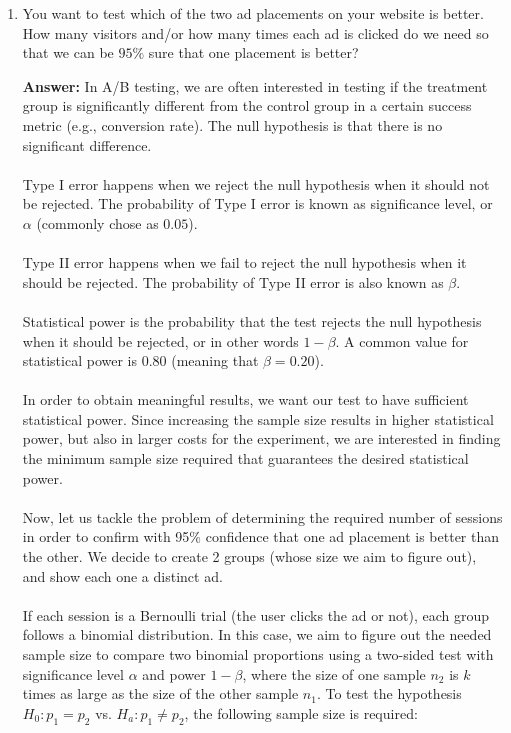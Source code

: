 \documentclass{article}
\newenvironment{QandA}{\begin{enumerate}[label=\arabic*.]}{\end{enumerate}}
\newenvironment{answer}{\par\normalfont \textbf{Answer:}}{}
\begin{document}
\begin{QandA}
    \item You want to test which of the two ad placements on your website is better. How many visitors and/or how many times each ad is clicked do we need so that we can be $95\%$ sure that one placement is better?
    \begin{answer}
        In A/B testing, we are often interested in testing if the treatment group is significantly different from the control group in a certain success metric (e.g., conversion rate). The null hypothesis is that there is no significant difference. \\\\
        Type I error happens when we reject the null hypothesis when it should not be rejected. The probability of Type I error is known as significance level, or $\alpha$ (commonly chose as $0.05$). \\\\
        Type II error happens when we fail to reject the null hypothesis when it should be rejected. The probability of Type II error is also known as $\beta$.\\\\
        Statistical power is the probability that the test rejects the null hypothesis when it should be rejected, or in other words $1 - \beta$. A common value for statistical power is $0.80$ (meaning that $\beta = 0.20$). \\\\
        In order to obtain meaningful results, we want our test to have sufficient statistical power. Since increasing the sample size results in higher statistical power, but also in larger costs for the experiment, we are interested in finding the minimum sample size required that guarantees the desired statistical power. \\\\
        Now, let us tackle the problem of determining the required number of sessions in order to confirm with 95\% confidence that one ad placement is better than the other. We decide to create 2 groups (whose size we aim to figure out), and show each one a distinct ad. \\\\
        If each session is a Bernoulli trial (the user clicks the ad or not), each group follows a binomial distribution. In this case, we aim to figure out the needed sample size to compare two binomial proportions using a two-sided test with significance level $\alpha$ and power $1-\beta$, where the size of one sample $n_2$ is $k$ times as large as the size of the other sample $n_1$. To test the hypothesis $H_0: p_1 = p_2$ vs. $H_a: p_1 \neq p_2$, the following sample size is required:

\end{answer}
\end{QandA}
\end{document}

